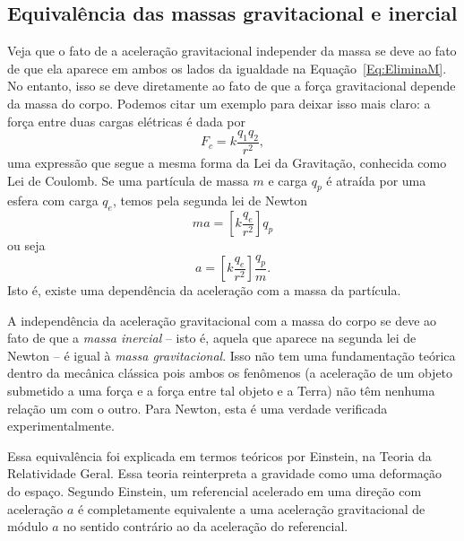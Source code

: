 
\subsection{Equivalência das massas gravitacional e inercial}

Veja que o fato de a aceleração gravitacional independer da massa se deve ao fato de que ela aparece em ambos os lados da igualdade na Equação~\eqref{Eq:EliminaM}. No entanto, isso se deve diretamente ao fato de que a força gravitacional depende da massa do corpo. Podemos citar um exemplo para deixar isso mais claro: a força entre duas cargas elétricas é dada por
\begin{equation}
  F_c = k \frac{q_1q_2}{r^2},
\end{equation}
%
uma expressão que segue a mesma forma da Lei da Gravitação, conhecida como Lei de Coulomb. Se uma partícula de massa $m$ e carga $q_p$ é atraída por uma esfera com carga $q_e$, temos pela segunda lei de Newton
\begin{equation}
  ma = \left[k \frac{q_e}{r^2}\right] q_p
\end{equation}
%
ou seja
\begin{equation}
  a = \left[k \frac{q_e}{r^2}\right] \frac{q_p}{m}.
\end{equation}
%
Isto é, existe uma dependência da aceleração com a massa da partícula.

A independência da aceleração gravitacional com a massa do corpo se deve ao fato de que a \emph{massa inercial} -- isto é, aquela que aparece na segunda lei de Newton -- é igual à \emph{massa gravitacional}. Isso não tem uma fundamentação teórica dentro da mecânica clássica pois ambos os fenômenos (a aceleração de um objeto submetido a uma força e a força entre tal objeto e a Terra) não têm nenhuma relação um com o outro. Para Newton, esta é uma verdade verificada experimentalmente.

Essa equivalência foi explicada em termos teóricos por Einstein, na Teoria da Relatividade Geral. Essa teoria reinterpreta a gravidade como uma deformação do espaço. Segundo Einstein, um referencial acelerado em uma direção com aceleração $a$ é completamente equivalente a uma aceleração gravitacional de módulo $a$ no sentido contrário ao da aceleração do referencial.

